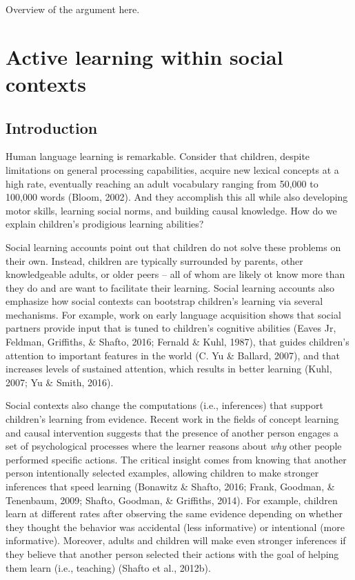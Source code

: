\documentclass[oneside]{report}
\begin{document}
Overview of the argument here.

\hypertarget{active-learning-within-social-contexts}{%
\chapter{Active learning within social
contexts}\label{active-learning-within-social-contexts}}

\hypertarget{introduction}{%
\section{Introduction}\label{introduction}}

Human language learning is remarkable. Consider that children, despite
limitations on general processing capabilities, acquire new lexical
concepts at a high rate, eventually reaching an adult vocabulary ranging
from 50,000 to 100,000 words (Bloom, 2002). And they accomplish this all
while also developing motor skills, learning social norms, and building
causal knowledge. How do we explain children's prodigious learning
abilities?

Social learning accounts point out that children do not solve these
problems on their own. Instead, children are typically surrounded by
parents, other knowledgeable adults, or older peers -- all of whom are
likely ot know more than they do and are want to facilitate their
learning. Social learning accounts also emphasize how social contexts
can bootstrap children's learning via several mechanisms. For example,
work on early language acquisition shows that social partners provide
input that is tuned to children's cognitive abilities (Eaves Jr,
Feldman, Griffiths, \& Shafto, 2016; Fernald \& Kuhl, 1987), that guides
children's attention to important features in the world (C. Yu \&
Ballard, 2007), and that increases levels of sustained attention, which
results in better learning (Kuhl, 2007; Yu \& Smith, 2016).

Social contexts also change the computations (i.e., inferences) that
support children's learning from evidence. Recent work in the fields of
concept learning and causal intervention suggests that the presence of
another person engages a set of psychological processes where the
learner reasons about \emph{why} other people performed specific
actions. The critical insight comes from knowing that another person
intentionally selected examples, allowing children to make stronger
inferences that speed learning (Bonawitz \& Shafto, 2016; Frank,
Goodman, \& Tenenbaum, 2009; Shafto, Goodman, \& Griffiths, 2014). For
example, children learn at different rates after observing the same
evidence depending on whether they thought the behavior was accidental
(less informative) or intentional (more informative). Moreover, adults
and children will make even stronger inferences if they believe that
another person selected their actions with the goal of helping them
learn (i.e., teaching) (Shafto et al., 2012b).
\end{document}
